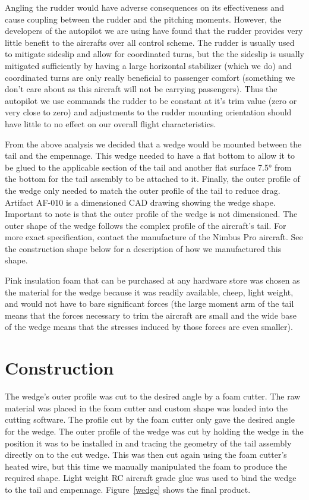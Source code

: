 \documentclass[]{auvsi_doc}
\begin{document}
Angling the rudder would have adverse consequences on its effectiveness and cause coupling between the rudder and the pitching moments. However, the developers of the autopilot we are using have found that the rudder provides very little benefit to the aircrafts over all control scheme. The rudder is usually used to mitigate sideslip and allow for coordinated turns, but the the sideslip is usually mitigated sufficiently by having a large horizontal stabilizer (which we do) and coordinated turns are only really beneficial to passenger comfort (something we don't care about as this aircraft will not be carrying passengers). Thus the autopilot we use commands the rudder to be constant at it's trim value (zero or very close to zero) and adjustments to the rudder mounting orientation should have little to no effect on our overall flight characteristics.
 
From the above analysis we decided that a wedge would be mounted between the tail and the empennage. This wedge needed to have a flat bottom to allow it to be glued to the applicable section of the tail and another flat surface 7.5° from the bottom for the tail assembly to be attached to it. Finally, the outer profile of the wedge only needed to match the outer profile of the tail to reduce drag. Artifact AF-010 is a dimensioned CAD drawing showing the wedge shape. Important to note is that the outer profile of the wedge is not dimensioned. The outer shape of the wedge follows the complex profile of the aircraft's tail. For more exact specification, contact the manufacture of the Nimbus Pro aircraft. See the construction shape below for a description of how we manufactured this shape. 
 
Pink insulation foam that can be purchased at any hardware store was chosen as the material for the wedge because it was readily available, cheep, light weight, and would not have to bare significant forces (the large moment arm of the tail means that the forces necessary to trim the aircraft are small and the wide base of the wedge means that the stresses induced by those forces are even smaller). 

\section{Construction}

The wedge's outer profile was cut to the desired angle by a foam cutter. The raw material was placed in the foam cutter and custom shape was loaded into the cutting software. The profile cut by the foam cutter only gave the desired angle for the wedge. The outer profile of the wedge was cut by holding the wedge in the position it was to be installed in and tracing the geometry of the tail assembly directly on to the cut wedge. This was then cut again using the foam cutter's heated wire, but this time we manually manipulated the foam to produce the required shape. Light weight RC aircraft grade glue was used to bind the wedge to the tail and empennage. Figure~\ref{wedge} shows the final product.
\end{document}
